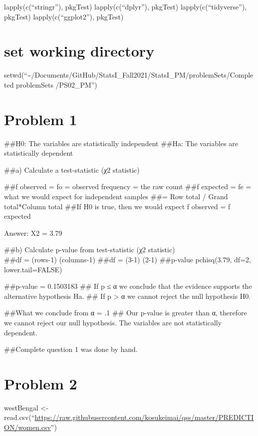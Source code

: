 \documentclass[
]{article}
\begin{document}
lapply(c(``stringr''), pkgTest) lapply(c(``dplyr''), pkgTest)
lapply(c(``tidyverse''), pkgTest) lapply(c(``ggplot2''), pkgTest)

\hypertarget{set-working-directory}{%
\section{set working directory}\label{set-working-directory}}

setwd(``\textasciitilde/Documents/GitHub/StatsI\_Fall2021/StatsI\_PM/problemSets/Completed
problemSets /PS02\_PM'')

\hypertarget{problem-1}{%
\section{Problem 1}\label{problem-1}}

\#\#H0: The variables are statistically independent \#\#Ha: The
variables are statistically dependent

\#\#a) Calculate a test-statistic (χ2 statistic)

\#\#f observed = fo = observed frequency = the raw count \#\#f expected
= fe = what we would expect for independent samples \#\#= Row total /
Grand total*Column total \#\#If H0 is true, then we would expect f
observed = f expected

Answer: X2 = 3.79

\#\#b) Calculate p-value from test-statistic (χ2 statistic)\\
\#\#df = (rows-1) (columns-1) \#\#df = (3-1) (2-1) \#\#p-value
pchisq(3.79, df=2, lower.tail=FALSE)

\#\#p-value = 0.1503183 \#\# If p ≤ α we conclude that the evidence
supports the alternative hypothesis Ha. \#\# If p \textgreater{} α we
cannot reject the null hypothesis H0.

\#\#What we conclude from α = .1 \#\# Our p-value is greater than α,
therefore we cannot reject our null hypothesis. The variables are not
statistically dependent.

\#\#Complete question 1 was done by hand.

\hypertarget{problem-2}{%
\section{Problem 2}\label{problem-2}}

westBengal \textless-
read.csv(``\url{https://raw.githubusercontent.com/kosukeimai/qss/master/PREDICTION/women.csv}'')
\end{document}
